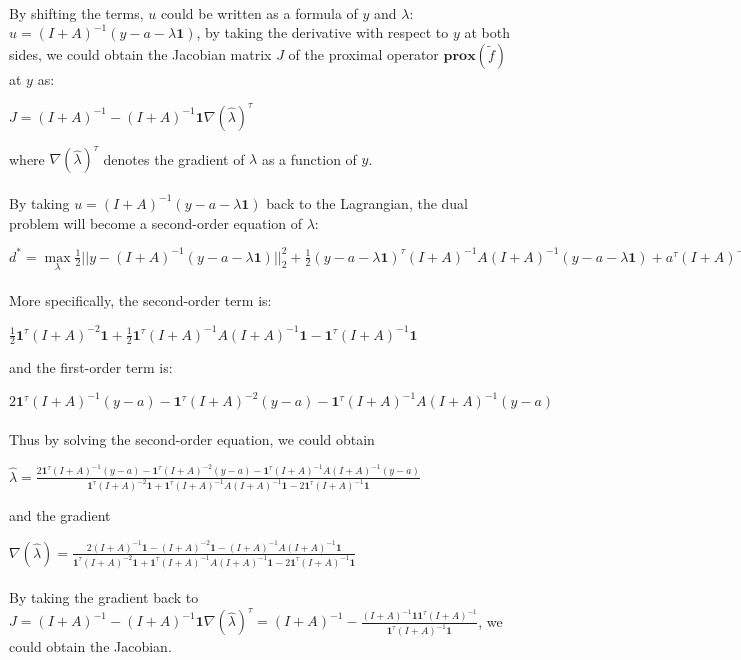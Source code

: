 \documentclass{article}
\begin{document}
\paragraph{}By shifting the terms, $u$ could be written as a formula of $y$ and $\lambda$: $u = (I+A)^{-1}(y-a-\lambda\textbf{1})$, by taking the derivative with respect to $y$ at both sides, we could obtain the Jacobian matrix $J$ of the proximal operator $\textbf{prox}(\tilde{f})$ at $y$ as:
\begin{center}
$J = (I+A)^{-1} -(I+A)^{-1}\textbf{1}\nabla(\hat{\lambda})^{\tau}$
\end{center}
where $\nabla(\hat{\lambda})^{\tau}$ denotes the gradient of $\lambda$ as a function of $y$.
\paragraph{}By taking $u = (I+A)^{-1}(y-a-\lambda\textbf{1})$ back to the Lagrangian, the dual problem will become a second-order equation of $\lambda$:
\begin{center}
$d^{*} = \max\limits_{\lambda} \frac{1}{2}||y-(I+A)^{-1}(y-a-\lambda\textbf{1})||_{2}^{2}+\frac{1}{2}(y-a-\lambda\textbf{1})^{\tau}(I+A)^{-1}A(I+A)^{-1}(y-a-\lambda\textbf{1})+a^{\tau}(I+A)^{-1}(y-a-\lambda\textbf{1})+\lambda\textbf{1}^{\tau}(I+A)^{-1}(y-a-\lambda\textbf{1})$
\end{center}
\paragraph{}More specifically, the second-order term is:
\begin{center}
$\frac{1}{2}\textbf{1}^{\tau}(I+A)^{-2}\textbf{1}+\frac{1}{2}\textbf{1}^{\tau}(I+A)^{-1}A(I+A)^{-1}\textbf{1}-\textbf{1}^{\tau}(I+A)^{-1}\textbf{1}$
\end{center}
and the first-order term is:
\begin{center}
$2\textbf{1}^{\tau}(I+A)^{-1}(y-a)-\textbf{1}^{\tau}(I+A)^{-2}(y-a)-\textbf{1}^{\tau}(I+A)^{-1}A(I+A)^{-1}(y-a)$
\end{center}
\paragraph{}Thus by solving the second-order equation, we could obtain
\begin{center}
$\hat{\lambda} = \frac{2\textbf{1}^{\tau}(I+A)^{-1}(y-a)-\textbf{1}^{\tau}(I+A)^{-2}(y-a)-\textbf{1}^{\tau}(I+A)^{-1}A(I+A)^{-1}(y-a)}{\textbf{1}^{\tau}(I+A)^{-2}\textbf{1}+\textbf{1}^{\tau}(I+A)^{-1}A(I+A)^{-1}\textbf{1}-2\textbf{1}^{\tau}(I+A)^{-1}\textbf{1}}$
\end{center}
and the gradient
\begin{center}
$\nabla(\hat{\lambda}) = \frac{2(I+A)^{-1}\textbf{1}-(I+A)^{-2}\textbf{1}-(I+A)^{-1}A(I+A)^{-1}\textbf{1}}{\textbf{1}^{\tau}(I+A)^{-2}\textbf{1}+\textbf{1}^{\tau}(I+A)^{-1}A(I+A)^{-1}\textbf{1}-2\textbf{1}^{\tau}(I+A)^{-1}\textbf{1}}$\\
\end{center}
\paragraph{}By taking the gradient back to $J = (I+A)^{-1} -(I+A)^{-1}\textbf{1}\nabla(\hat{\lambda})^{\tau} = (I+A)^{-1} -\frac{(I+A)^{-1}\textbf{1}\textbf{1}^{\tau}(I+A)^{-1}}{\textbf{1}^{\tau}(I+A)^{-1}\textbf{1}}$, we could obtain the Jacobian.
\end{document}
